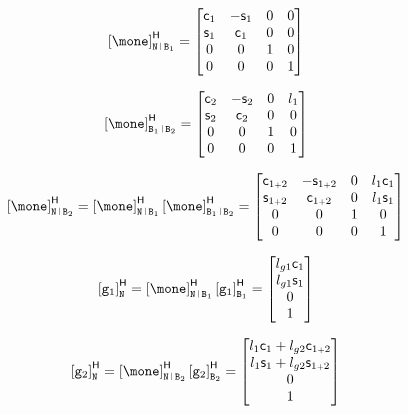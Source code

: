 \documentclass[a4paper,11pt,brazil,fleqn]{article}
\begin{document}
\begin{itemize}
\begin{equation}
\hvct{\mone}_{\ttN \rl \ttB_1} =
\begin{bmatrix}
\ccos_1 & -\ssin_1 & 0 & 0 \\
\ssin_1 & \ccos_1 & 0 & 0 \\
0 & 0 & 1 & 0 \\
0 & 0 & 0 & 1
\end{bmatrix}
\end{equation}

\begin{equation}
\hvct{\mone}_{\ttB_1 \rl \ttB_2} =
\begin{bmatrix}
\ccos_2 & -\ssin_2 & 0 & l_1 \\
\ssin_2 & \ccos_2 & 0 &  0 \\
0 & 0 & 1 & 0\\
0 & 0 & 0 & 1
\end{bmatrix}
\end{equation}

\begin{equation}
\hvct{\mone}_{\ttN \rl \ttB_2} = \hvct{\mone}_{\ttN \rl \ttB_1} \hvct{\mone}_{\ttB_1 \rl \ttB_2} =
\begin{bmatrix}
\ccos_{1\plus 2} & -\ssin_{1\plus 2} & 0 & l_1 \ccos_1\\
\ssin_{1\plus 2} & \ccos_{1\plus 2} & 0 & l_1 \ssin_1 \\
0 & 0 & 1 & 0\\
0 & 0 & 0 & 1
\end{bmatrix}
\end{equation}

\begin{equation}
\hvct{\ttg_1}_{\ttN}  = \hvct{\mone}_{\ttN \rl \ttB_1} \hvct{\ttg_1}_{\ttB_1} =
\begin{bmatrix}
l_{g1} \ccos_1 \\
l_{g1} \ssin_1 \\
0 \\
1
\end{bmatrix}
\end{equation}

\begin{equation}
\hvct{\ttg_2}_{\ttN}  = \hvct{\mone}_{\ttN \rl \ttB_2} \hvct{\ttg_2}_{\ttB_2} =
\begin{bmatrix}
l_1 \ccos_1 + l_{g2} \ccos_{1\plus 2} \\
l_1 \ssin_1 + l_{g2} \ssin_{1\plus 2} \\
0 \\
1
\end{bmatrix}
\end{equation}


\end{itemize}
\end{document}
